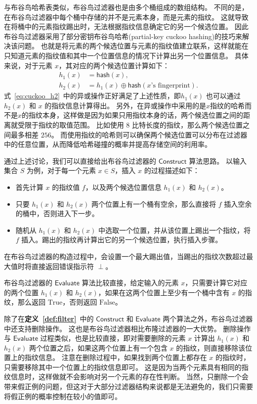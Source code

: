 与布谷鸟哈希表类似，布谷鸟过滤器也是由多个桶组成的数组结构。
不同的是，在布谷鸟过滤器中每个桶中存储的并不是元素本身，而是元素的指纹。
这就导致在将桶中的元素指纹踢出时，无法根据指纹信息确定它的另一个候选位置。
因此布谷鸟过滤器采用了部分密钥布谷鸟哈希(partial-key cuckoo hashing)的技巧来解决该问题。
也就是将元素的两个候选位置与元素的指纹值建立联系，这样就能在只知道元素的指纹值和其中一个位置信息的情况下计算出另一个位置信息。
具体来说，对于元素 $x$，其对应的两个候选位置计算如下：
\begin{align}
  h_1(x) & = \mathsf{hash}(x), \\
  h_2(x) & = h_1(x) \oplus \mathsf{hash}(x\mbox{'s fingerprint}). \label{eq:cuckoo_h2}
\end{align}
式~\ref{eq:cuckoo_h2}~中的异或操作正好满足了上述性质，即$h_1(x)$ 也可以通过 $h_2(x)$ 和 $x$ 的指纹信息计算得出。
另外，在异或操作中采用的是$x$指纹的哈希而不是$x$的指纹本身，这样做是因为如果只用指纹本身的话，两个候选位置之间的距离就受限于指纹的取值范围。
比如使用 $8$ 比特长度的指纹，那么两个候选位置之间最多相差 $256$。
而使用指纹的哈希则可以确保两个候选位置可以分布在过滤器中的任意位置，从而降低哈希碰撞的概率并提高存储空间的利用率。

通过上述讨论，我们可以直接给出布谷鸟过滤器的 $\mathsf{Construct}$ 算法思路。
以输入集合 $S$ 为例，对于每一个元素 $x\in S$，插入 $x$ 的过程描述如下：
\begin{itemize}
  \item 首先计算 $x$ 的指纹值 $f$，以及两个候选位置信息 $h_1(x)$ 和 $h_2(x)$。
  \item 只要 $h_1(x)$ 和 $h_2(x)$ 两个位置上有一个桶有空余，那么直接将 $f$ 插入空余的桶中，否则进入下一步。
  \item 随机从 $h_1(x)$ 和 $h_2(x)$ 中选取一个位置，并从该位置上踢出一个指纹，将 $f$ 插入。踢出的指纹再计算出它的另一个候选位置，执行插入步骤。
\end{itemize}
在布谷鸟过滤器的构造过程中，会设置一个最大踢出值，当踢出的指纹次数超过最大值时将直接返回错误指示符 $\perp$。

布谷鸟过滤器的 $\mathsf{Evaluate}$ 算法比较直接，给定输入的元素 $x$，只需要计算它对应的两个位置 $h_1(x)$ 和 $h_2(x)$，如果在这两个位置上至少有一个桶中含有 $x$ 的指纹，那么返回 $\mbox{True}$，否则返回 $\mbox{False}$。

除了在\textbf{定义~\ref{def:filter}}~中的 $\mathsf{Construct}$ 和 $\mathsf{Evaluate}$ 两个算法之外，布谷鸟过滤器中还支持删除操作。
这也是布谷鸟过滤器相比布隆过滤器的一大优势。
删除操作与 $\mathsf{Evaluate}$ 过程类似，也是比较直接，即对需要删除的元素 $x$ 计算出 $h_1(x)$ 和 $h_2(x)$ 两个位置之后，如果这两个位置上有一个包含 $x$ 的指纹，则直接移除该位置上的指纹信息。
注意在删除过程中，如果找到两个位置上都存在 $x$ 的指纹时，只需要移除其中一个位置上的指纹信息即可。
这是因为当两个元素具有相同的指纹信息时，这样做就不会影响对另一个元素的存在性判断。
当然，只删除一个会带来假正例的问题，但这对于大部分过滤器结构来说都是无法避免的，我们只需要将假正例的概率控制在较小的值即可。

